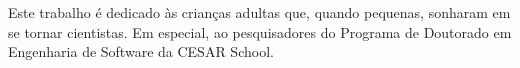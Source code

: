 Este trabalho é dedicado às crianças adultas que,
quando pequenas, sonharam em se tornar cientistas. 
Em especial, ao pesquisadores do Programa de Doutorado em Engenharia de Software da CESAR School.
